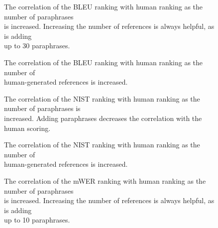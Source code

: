 \begin{figure} 
\begin{center}
\textwidth
\mbox{}
\end{center}
\caption{
The correlation of the BLEU ranking with human ranking as the number of paraphrases\\
is increased. Increasing the number of references is always helpful, as is adding\\
up to 30 paraphrases.}
\label{fig:para_bleu}
\end{figure}

\begin{figure} 
\begin{center}
\textwidth
\mbox{}
\end{center}
\caption{
The correlation of the BLEU ranking with human ranking as the number of \\
human-generated references is increased.}
\label{fig:real_bleu}
\end{figure}

\begin{figure} 
\begin{center}
\textwidth
\mbox{}
\end{center}
\caption{
The correlation of the NIST ranking with human ranking as the number of paraphrases is \\
increased. Adding paraphrases decreases the correlation with the human scoring.}
\label{fig:para_nist}
\end{figure}

\begin{figure} 
\begin{center}
\textwidth
\mbox{}
\end{center}
\caption{
The correlation of the NIST ranking with human ranking as the number of \\
human-generated references is increased.}
\label{fig:real_nist}
\end{figure}

\begin{figure} 
\begin{center}
\textwidth
\mbox{}
\end{center}
\caption{
The correlation of the mWER ranking with human ranking as the number of paraphrases\\
is increased. Increasing the number of references is always helpful, as is adding \\
up to 10 paraphrases.
}
\label{fig:para_edit}
\end{figure}


